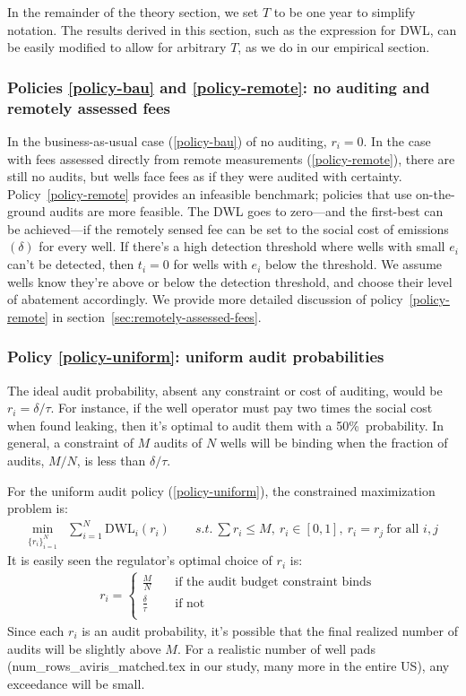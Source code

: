 \documentclass[12pt,oneside,letterpaper]{article}
\theoremstyle{definition}
\begin{document}
\begin{refsection}
In the remainder of the theory section, we set \(T\) to be one year to simplify notation.
The results derived in this section, such as the expression for \gls{DWL}, can be easily modified to allow for arbitrary \(T\), as we do in our empirical section.

\subsubsection{Policies \ref{policy-bau} and \ref{policy-remote}: no auditing and remotely assessed fees}
In the business-as-usual case (\ref{policy-bau}) of no auditing, \(r_i = 0\).
In the case with fees assessed directly from remote measurements (\ref{policy-remote}), there are still no audits, but wells face fees as if they were audited with certainty.
Policy~\ref{policy-remote} provides an infeasible benchmark; policies that use on-the-ground audits are more feasible.
The \gls{DWL} goes to zero---and the first-best can be achieved---if the remotely sensed fee can be set to the social cost of emissions \((\delta)\) for every well.
If there's a high detection threshold where wells with small \(e_i\) can't be detected, then \(t_i = 0\) for wells with \(e_i\) below the threshold.
We assume wells know they're above or below the detection threshold, and choose their level of abatement accordingly.
We provide more detailed discussion of policy~\ref{policy-remote} in section~\ref{sec:remotely-assessed-fees}.

\subsubsection{Policy \ref{policy-uniform}: uniform audit probabilities}
The ideal audit probability, absent any constraint or cost of auditing, would be \(r_i = \delta / \tau\).
For instance, if the well operator must pay two times the social cost when found leaking, then it's optimal to audit them with a 50\%~probability.
In general, a constraint  of \(M\) audits of \(N\) wells will be binding when the fraction of audits, \(M / N\), is less than \(\delta / \tau\).

For the uniform audit policy (\ref{policy-uniform}), the constrained maximization problem is:
\begin{align*}
\min_{\{r_i\}^{N}_{i=1}} &  \sum^{N}_{i=1} \text{DWL}_i(r_i) \qquad
\textit{s.t.}\ \sum r_i \leq M,\ r_i \in [0,1],\ r_i = r_j \ \text{for all } i,j
\end{align*}
It is easily seen the regulator's optimal choice of \(r_i\) is:
\begin{align*}
& r_i = \begin{cases}
  \frac{M}{N} & \quad \text{if the audit budget constraint binds} \\[5pt]
  \frac{\delta}{\tau}  & \quad \text{if not}\\[5pt]
\end{cases}
\end{align*}
Since each \(r_i\) is an audit probability, it's possible that the final realized number of audits will be slightly above \(M\).
For a realistic number of well pads
({num_rows_aviris_matched.tex} in our study, many more in the entire US), any exceedance will be small.


\end{refsection}
\end{document}
